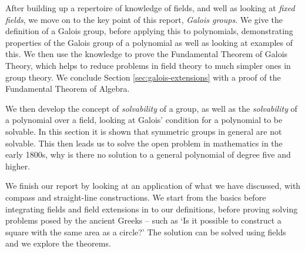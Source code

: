 After building up a repertoire of knowledge of fields, and well as looking at \textit{fixed fields}, we move on to the key point of this report, \textit{Galois groups}. We give the definition of a Galois group, before applying this to polynomials, demonstrating properties of the Galois group of a polynomial as well as looking at examples of this. We then use the knowledge to prove the Fundamental Theorem of Galois Theory, which helps to reduce problems in field theory to much simpler ones in group theory. We conclude Section \ref{sec:galois-extensions} with a proof of the Fundamental Theorem of Algebra.

We then develop the concept of \textit{solvability} of a group, as well as the \textit{solvability} of a polynomial over a field, looking at Galois’ condition for a polynomial to be solvable. In this section it is shown that symmetric groups in general are not solvable. This then leads us to solve the open problem in mathematics in the early 1800s, why is there no solution to a general polynomial of degree five and higher.

We finish our report by looking at an application of what we have discussed, with compass and straight-line constructions. We start from the basics before integrating fields and field extensions in to our definitions, before proving solving problems posed by the ancient Greeks – such as ‘Is it possible to construct a square with the same area as a circle?’ The solution can be solved using fields and we explore the theorems.
